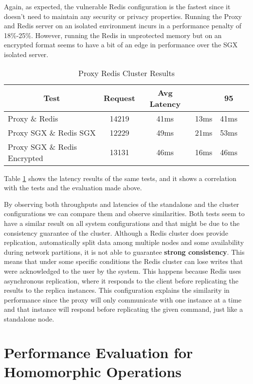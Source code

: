 Again, as expected, the vulnerable Redis configuration is the fastest since it doesn't need to maintain any security or privacy properties. Running the Proxy and Redis server on an isolated environment incurs in a performance penalty of 18\%-25\%. However, running the Redis in unprotected memory but on an encrypted format seems to have a bit of an edge in performance over the \gls{SGX} isolated server.

\begin{table}[ht]
	\caption{Proxy Redis Cluster Results}
	\label{tab:proxy_redis_cluster_latency_results}
\centering
\begin{tabular}{lccccc}
	\toprule
	\multicolumn{1}{c}{\textbf{Test}} & \pmb{\#}\textbf{Request} & \textbf{Avg Latency} & \pmb{\ensuremath{\sigma}} & \textbf{95}\pmb{\%} \\
	\midrule
		Proxy \& Redis & 14219 & 41ms & 13ms & 41ms  				\\
		Proxy SGX \& Redis SGX & 12229 & 49ms & 21ms & 53ms  		\\
		Proxy SGX \& Redis Encrypted & 13131 & 46ms & 16ms & 46ms 	\\
	\bottomrule
\end{tabular}
\end{table}

Table \ref{tab:proxy_redis_cluster_latency_results} shows the latency results of the same tests, and it shows a correlation with the tests and the evaluation made above.

By observing both throughputs and latencies of the standalone and the cluster configurations we can compare them and observe similarities. Both tests seem to have a similar result on all system configurations and that might be due to the consistency guarantee of the cluster. Although a Redis cluster does provide replication, automatically split data among multiple nodes and some availability during network partitions, it is not able to guarantee \textbf{strong consistency}. This means that under some specific conditions the Redis cluster can lose writes that were acknowledged to the user by the system. This happens because Redis uses asynchronous replication, where it responds to the client before replicating the results to the replica instances. This configuration explains the similarity in performance since the proxy will only communicate with one instance at a time and that instance will respond before replicating the given command, just like a standalone node.

\section{Performance Evaluation for Homomorphic Operations}
\label{sec:performance_evaluation_homomorphic_operations}

